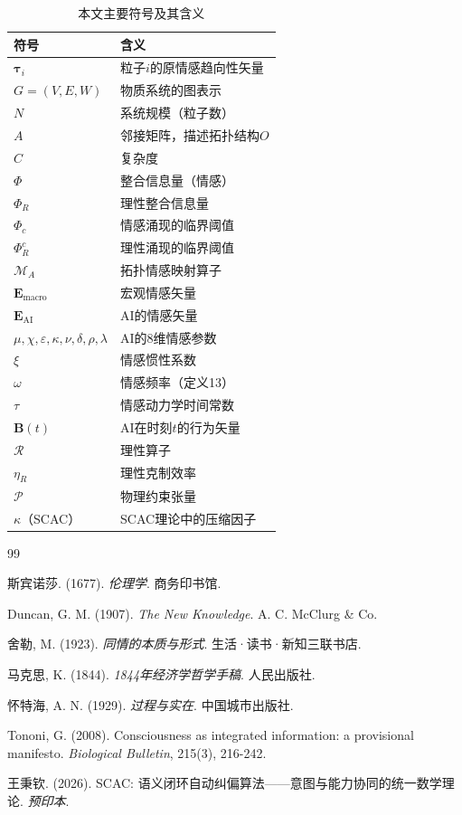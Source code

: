 \documentclass[12pt,a4paper]{article}
\theoremstyle{plain}
\newcommand{\ve}[1]{\bm{#1}}                    %
\newcommand{\Evec}{\ve{E}}                        %
\newcommand{\tauvec}{\ve{\tau}}                   %
\newcommand{\Bvec}{\ve{B}}                        %
\begin{document}
\begin{table}[h]
\centering
\caption{本文主要符号及其含义}
\begin{tabular}{ll}
\toprule
\textbf{符号} & \textbf{含义} \\
\midrule
$\tauvec_i$ & 粒子$i$的原情感趋向性矢量 \\
$G=(V,E,W)$ & 物质系统的图表示 \\
$N$ & 系统规模（粒子数） \\
$A$ & 邻接矩阵，描述拓扑结构$O$ \\
$C$ & 复杂度 \\
$\Phi$ & 整合信息量（情感） \\
$\Phi_R$ & 理性整合信息量 \\
$\Phi_c$ & 情感涌现的临界阈值 \\
$\Phi_R^c$ & 理性涌现的临界阈值 \\
$\mathcal{M}_A$ & 拓扑情感映射算子 \\
$\Evec_{\text{macro}}$ & 宏观情感矢量 \\
$\Evec_{\text{AI}}$ & AI的情感矢量 \\
$\mu, \chi, \varepsilon, \kappa, \nu, \delta, \rho, \lambda$ & AI的8维情感参数 \\
$\xi$ & 情感惯性系数 \\
$\omega$ & 情感频率（定义13） \\
$\tau$ & 情感动力学时间常数 \\
$\Bvec(t)$ & AI在时刻$t$的行为矢量 \\
$\mathcal{R}$ & 理性算子 \\
$\eta_R$ & 理性克制效率 \\
$\mathcal{P}$ & 物理约束张量 \\
$\kappa$（SCAC） & SCAC理论中的压缩因子 \\
\bottomrule
\end{tabular}
\end{table}

\begin{thebibliography}{99}

斯宾诺莎. (1677). \textit{伦理学}. 商务印书馆.

Duncan, G. M. (1907). \textit{The New Knowledge}. A. C. McClurg \& Co.

舍勒, M. (1923). \textit{同情的本质与形式}. 生活·读书·新知三联书店.

马克思, K. (1844). \textit{1844年经济学哲学手稿}. 人民出版社.

怀特海, A. N. (1929). \textit{过程与实在}. 中国城市出版社.

Tononi, G. (2008). Consciousness as integrated information: a provisional manifesto. \textit{Biological Bulletin}, 215(3), 216-242.

王秉钦. (2026). SCAC: 语义闭环自动纠偏算法——意图与能力协同的统一数学理论. \textit{预印本}.

\end{thebibliography}
\end{document}
